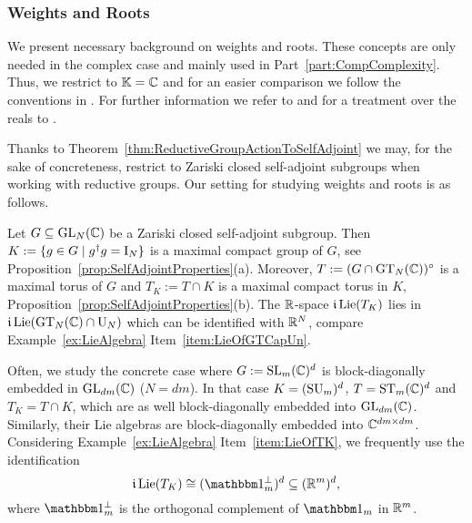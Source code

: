 \subsubsection{Weights and Roots}


We present necessary background on weights and roots. These concepts are only needed in the complex case and mainly used in Part~\ref{part:CompComplexity}. Thus, we restrict to $\mathbb K = \mathbb C$ and for an easier comparison we follow the conventions in \cite[Section~2]{GradflowArXiv}.
For further information we refer to \cite{FultonHarris, GoodmanWallachBook, HallBook, KnappBook, ProcesiBook} and for a treatment over the reals to \cite{borel2006lie, OnishchikVinbergBook}.

\medskip

Thanks to Theorem~\ref{thm:ReductiveGroupActionToSelfAdjoint} we may, for the sake of concreteness, restrict to Zariski closed self-adjoint subgroups when working with reductive groups. Our setting for studying weights and roots is as follows.

\begin{setting}\label{set:Weights}
	Let $G \subseteq \operatorname{GL}_N(\mathbb C)$ be a Zariski closed self-adjoint subgroup. Then $K := \{ g\in G \mid g^{\dagger} g = \operatorname{I}_N \}$ is a maximal compact group of $G$, see Proposition~\ref{prop:SelfAdjointProperties}(a). Moreover, $T := (G \cap \operatorname{GT}_N(\mathbb C) )^\circ$ is a maximal torus of $G$ and $T_K := T \cap K$ is a maximal compact torus in $K$, Proposition~\ref{prop:SelfAdjointProperties}(b). The $\mathbb R$-space $\mathfrak{i} \operatorname{Lie}(T_K)$ lies in $\mathfrak{i} \operatorname{Lie}(\operatorname{GT}_N(\mathbb C) \cap \operatorname{U}_N)$ which can be identified with $\mathbb R^N$, compare Example~\ref{ex:LieAlgebra} Item~\ref{item:LieOfGTCapUn}.
	
	Often, we study the concrete case where $G := \operatorname{SL}_m(\mathbb C)^d$ is block-diagonally embedded in $\operatorname{GL}_{dm}(\mathbb C)$ ($N = dm$). In that case $K = (\operatorname{SU}_m)^d$, $T = \operatorname{ST}_m(\mathbb C)^d$ and $T_K = T \cap K$, which are as well block-diagonally embedded into $\operatorname{GL}_{dm}(\mathbb C)$. Similarly, their Lie algebras are block-diagonally embedded into $\mathbb C^{dm \times dm}$.
	Considering Example~\ref{ex:LieAlgebra} Item~\ref{item:LieOfTK},  we frequently use the identification
		\[ \imag \Lie(T_K) \cong (\onePerp)^d \subseteq (\RR^m)^d , \]
	where $\onePerp$ is the orthogonal complement of $\ones_m$ in $\mathbb R^m$.
	\hfill{}
\end{setting}


